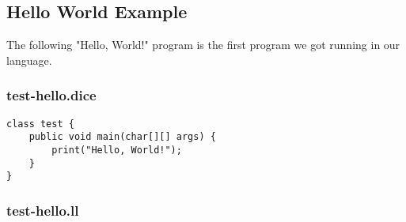 \subsection{Hello World Example}
The following "Hello, World!" program is the first program we got running in our language.

\subsubsection{test-hello.dice}
\begin{verbatim}
class test {
	public void main(char[][] args) {
		print("Hello, World!");
	}
}
\end{verbatim}

\subsubsection{test-hello.ll}
